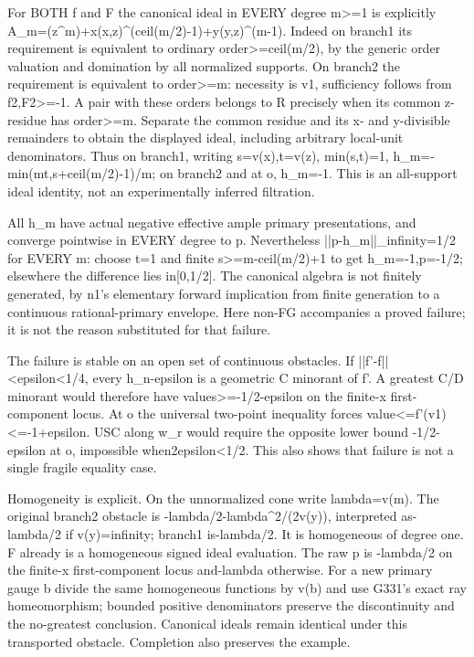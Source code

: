 \documentclass[11pt]{article}
\begin{document}
For BOTH f and F the canonical ideal in EVERY degree m\textgreater{}=1 is explicitly
A\_m=(z\textasciicircum{}m)+x(x,z)\textasciicircum{}(ceil(m/2)-1)+y(y,z)\textasciicircum{}(m-1).
Indeed on branch1 its requirement is equivalent to ordinary order\textgreater{}=ceil(m/2), by the generic order valuation and domination by all normalized supports. On branch2 the requirement is equivalent to order\textgreater{}=m: necessity is v1, sufficiency follows from f2,F2\textgreater{}=-1. A pair with these orders belongs to R precisely when its common z-residue has order\textgreater{}=m. Separate the common residue and its x- and y-divisible remainders to obtain the displayed ideal, including arbitrary local-unit denominators. Thus on branch1, writing s=v(x),t=v(z), min(s,t)=1,
h\_m=-min(mt,s+ceil(m/2)-1)/m;
on branch2 and at o, h\_m=-1. This is an all-support ideal identity, not an experimentally inferred filtration.

All h\_m have actual negative effective ample primary presentations, and converge pointwise in EVERY degree to p. Nevertheless ||p-h\_m||\_infinity=1/2 for EVERY m: choose t=1 and finite s\textgreater{}=m-ceil(m/2)+1 to get h\_m=-1,p=-1/2; elsewhere the difference lies in[0,1/2]. The canonical algebra is not finitely generated, by n1's elementary forward implication from finite generation to a continuous rational-primary envelope. Here non-FG accompanies a proved failure; it is not the reason substituted for that failure.

The failure is stable on an open set of continuous obstacles. If ||f'-f||\textless{}epsilon\textless{}1/4, every h\_n-epsilon is a geometric C minorant of f'. A greatest C/D minorant would therefore have values\textgreater{}=-1/2-epsilon on the finite-x first-component locus. At o the universal two-point inequality forces value\textless{}=f'(v1)\textless{}=-1+epsilon. USC along w\_r would require the opposite lower bound -1/2-epsilon at o, impossible when2epsilon\textless{}1/2. This also shows that failure is not a single fragile equality case.

Homogeneity is explicit. On the unnormalized cone write lambda=v(m). The original branch2 obstacle is -lambda/2-lambda\textasciicircum{}2/(2v(y)), interpreted as- lambda/2 if v(y)=infinity; branch1 is-lambda/2. It is homogeneous of degree one. F already is a homogeneous signed ideal evaluation. The raw p is -lambda/2 on the finite-x first-component locus and-lambda otherwise. For a new primary gauge b divide the same homogeneous functions by v(b) and use G331's exact ray homeomorphism; bounded positive denominators preserve the discontinuity and the no-greatest conclusion. Canonical ideals remain identical under this transported obstacle. Completion also preserves the example.
\end{document}
